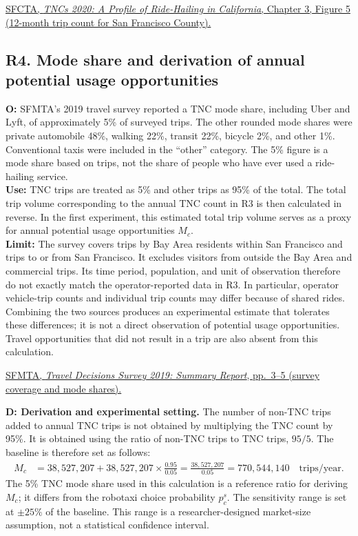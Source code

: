 \documentclass[10pt,a4paper]{article}
\begin{document}
\par\href{https://tncs2020.sfcta.org/ch3_general/}
{SFCTA, \textit{TNCs 2020: A Profile of Ride-Hailing in California}, Chapter 3, Figure 5 (12-month trip count for San Francisco County).}


\subsection*{\hypertarget{rationale-R4}{R4. Mode share and derivation of annual potential usage opportunities}}

\noindent
\textbf{O:}
SFMTA's 2019 travel survey reported a TNC mode share, including Uber and Lyft, of approximately 5\% of surveyed trips. The other rounded mode shares were private automobile 48\%, walking 22\%, transit 22\%, bicycle 2\%, and other 1\%. Conventional taxis were included in the ``other'' category. The 5\% figure is a mode share based on trips, not the share of people who have ever used a ride-hailing service. \\
\textbf{Use:}
TNC trips are treated as 5\% and other trips as 95\% of the total. The total trip volume corresponding to the annual TNC count in R3 is then calculated in reverse. In the first experiment, this estimated total trip volume serves as a proxy for annual potential usage opportunities $M_c$. \\
\textbf{Limit:}
The survey covers trips by Bay Area residents within San Francisco and trips to or from San Francisco. It excludes visitors from outside the Bay Area and commercial trips. Its time period, population, and unit of observation therefore do not exactly match the operator-reported data in R3. In particular, operator vehicle-trip counts and individual trip counts may differ because of shared rides. Combining the two sources produces an experimental estimate that tolerates these differences; it is not a direct observation of potential usage opportunities. Travel opportunities that did not result in a trip are also absent from this calculation.

\par\href{https://www.sfmta.com/media/20810/download?inline=}
{SFMTA, \textit{Travel Decisions Survey 2019: Summary Report}, pp.~3--5 (survey coverage and mode shares).}

\medskip
\noindent
\textbf{D: Derivation and experimental setting.}
The number of non-TNC trips added to annual TNC trips is not obtained by multiplying the TNC count by 95\%. It is obtained using the ratio of non-TNC trips to TNC trips, $95/5$. The baseline is therefore set as follows:
\[
\begin{aligned}
M_c
&=38{,}527{,}207
  +38{,}527{,}207\times\frac{0.95}{0.05}
=\frac{38{,}527{,}207}{0.05}
=770{,}544{,}140
\quad\text{trips/year}.
\end{aligned}
\]
The 5\% TNC mode share used in this calculation is a reference ratio for deriving $M_c$; it differs from the robotaxi choice probability $p_c^s$. The sensitivity range is set at $\pm25\%$ of the baseline. This range is a researcher-designed market-size assumption, not a statistical confidence interval.
\end{document}
